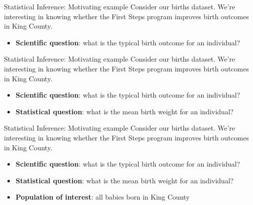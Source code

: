 \documentclass[
  ignorenonframetext,
]{beamer}
\providecommand{\tightlist}{%
  \setlength{\itemsep}{0pt}\setlength{\parskip}{0pt}}
\begin{document}
\begin{frame}{Statistical Inference: Motivating example}
\protect\hypertarget{statistical-inference-motivating-example}{}
Consider our births dataset. We're interesting in knowing whether the
First Steps program improves birth outcomes in King County.

\begin{itemize}
\tightlist
\item
  \textbf{Scientific question}: what is the {typical} {birth outcome}
  for an individual?
\end{itemize}
\end{frame}

\begin{frame}{Statistical Inference: Motivating example}
\protect\hypertarget{statistical-inference-motivating-example-1}{}
Consider our births dataset. We're interesting in knowing whether the
First Steps program improves birth outcomes in King County.

\begin{itemize}
\tightlist
\item
  \textbf{Scientific question}: what is the {typical} {birth outcome}
  for an individual?
\item
  \textbf{Statistical question}: what is the {mean} {birth weight} for
  an individual?
\end{itemize}
\end{frame}

\begin{frame}{Statistical Inference: Motivating example}
\protect\hypertarget{statistical-inference-motivating-example-2}{}
Consider our births dataset. We're interesting in knowing whether the
First Steps program improves birth outcomes in King County.

\begin{itemize}
\tightlist
\item
  \textbf{Scientific question}: what is the {typical} {birth outcome}
  for an individual?
\item
  \textbf{Statistical question}: what is the {mean} {birth weight} for
  an individual?
\item
  \textbf{Population of interest}: all babies born in King County
\end{itemize}
\end{frame}
\end{document}
